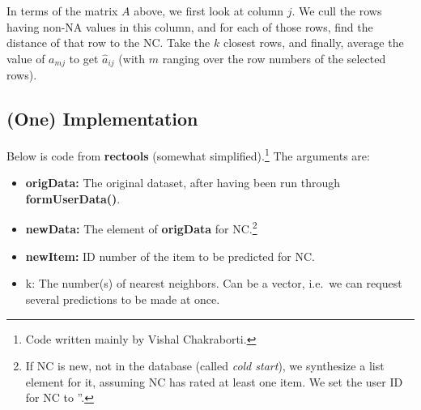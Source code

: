 In terms of the matrix $A$ above, we first look at column $j$.  We cull
the rows having non-NA values in this column, and for each of those
rows, find the distance of that row to the NC.  Take the $k$ closest
rows, and finally, average the value of $a_{mj}$ to get
$\widehat{a}_{ij}$ (with $m$ ranging over the row numbers of the
selected rows).

\subsection{(One) Implementation}

Below is code from \textbf{rectools} (somewhat
simplified).\footnote{Code written mainly by Vishal Chakraborti.}
The
arguments are:

\begin{itemize}

\item \textbf{origData:}  The original dataset, after having been run through
\textbf{formUserData()}. 

\item \textbf{newData:}  The element of \textbf{origData} for NC.\footnote{If
NC is new, not in the database (called \textit{cold start}), we
synthesize a list element for it, assuming NC has rated at least one
item.  We set the user ID for NC to ''.}

\item \textbf{newItem:}  ID number of the item to be predicted for NC.

\item k:  The number(s) of nearest neighbors.  Can be a vector, i.e.\ we
can request several predictions to be made at once.

\end{itemize} 

